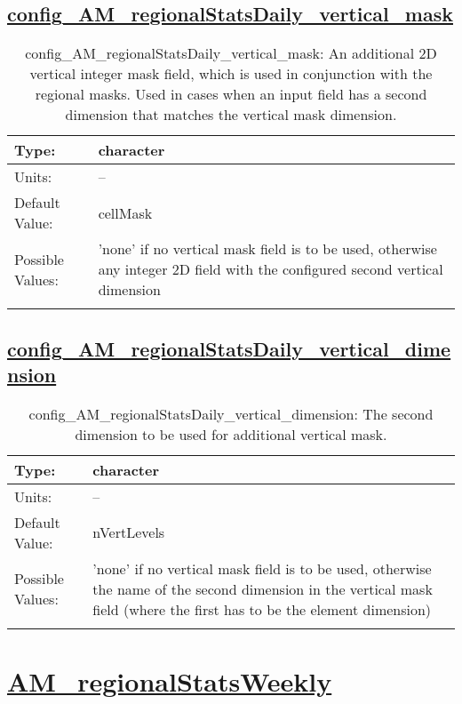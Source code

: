 \subsection[config\_AM\_regionalStatsDaily\_vertical\_mask]{\hyperref[sec:nm_tab_AM_regionalStatsDaily]{config\_AM\_regionalStatsDaily\_vertical\_mask}}
\label{subsec:nm_sec_config_AM_regionalStatsDaily_vertical_mask}
\begin{center}
\begin{longtable}{| p{2.0in} || p{4.0in} |}
    \hline
    Type: & character \\
    \hline
    Units: & -- \\
    \hline
    Default Value: & cellMask \\
    \hline
    Possible Values: & 'none' if no vertical mask field is to be used, otherwise any integer 2D field with the configured second vertical dimension \\
    \hline
    \caption{config\_AM\_regionalStatsDaily\_vertical\_mask: An additional 2D vertical integer mask field, which is used in conjunction with the regional masks. Used in cases when an input field has a second dimension that matches the vertical mask dimension.}
\end{longtable}
\end{center}
\subsection[config\_AM\_regionalStatsDaily\_vertical\_dimension]{\hyperref[sec:nm_tab_AM_regionalStatsDaily]{config\_AM\_regionalStatsDaily\_vertical\_dimension}}
\label{subsec:nm_sec_config_AM_regionalStatsDaily_vertical_dimension}
\begin{center}
\begin{longtable}{| p{2.0in} || p{4.0in} |}
    \hline
    Type: & character \\
    \hline
    Units: & -- \\
    \hline
    Default Value: & nVertLevels \\
    \hline
    Possible Values: & 'none' if no vertical mask field is to be used, otherwise the name of the second dimension in the vertical mask field (where the first has to be the element dimension) \\
    \hline
    \caption{config\_AM\_regionalStatsDaily\_vertical\_dimension: The second dimension to be used for additional vertical mask.}
\end{longtable}
\end{center}
\section[AM\_regionalStatsWeekly]{\hyperref[sec:nm_tab_AM_regionalStatsWeekly]{AM\_regionalStatsWeekly}}
\label{sec:nm_sec_AM_regionalStatsWeekly}
